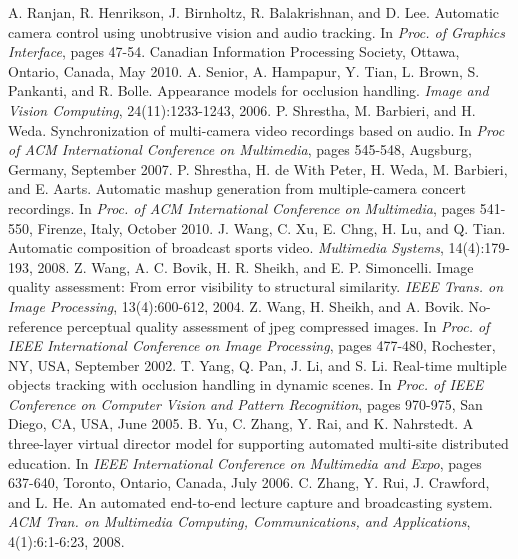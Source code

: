 \documentclass{sig-alternate}
\begin{document}
\begin{thebibliography}{9}
    A. Ranjan, R. Henrikson, J. Birnholtz, R. Balakrishnan, and D. Lee. Automatic camera control using unobtrusive vision and audio tracking. In \textit{Proc. of Graphics Interface}, pages 47-54. Canadian Information Processing Society, Ottawa, Ontario, Canada, May 2010.
    A. Senior, A. Hampapur, Y. Tian, L. Brown, S. Pankanti, and R. Bolle. Appearance models for occlusion handling. \textit{Image and Vision Computing}, 24(11):1233-1243, 2006.
    P. Shrestha, M. Barbieri, and H. Weda. Synchronization of multi-camera video recordings based on audio. In \textit{Proc of ACM International Conference on Multimedia}, pages 545-548, Augsburg, Germany, September 2007.
    P. Shrestha, H. de With Peter, H. Weda, M. Barbieri, and E. Aarts. Automatic mashup generation from multiple-camera concert recordings. In \textit{Proc. of ACM International Conference on Multimedia}, pages 541-550, Firenze, Italy, October 2010.
    J. Wang, C. Xu, E. Chng, H. Lu, and Q. Tian. Automatic composition of broadcast sports video. \textit{Multimedia Systems}, 14(4):179-193, 2008.
    Z. Wang, A. C. Bovik, H. R. Sheikh, and E. P. Simoncelli. Image quality assessment: From error visibility to structural similarity. \textit{IEEE Trans. on Image Processing}, 13(4):600-612, 2004.
    Z. Wang, H. Sheikh, and A. Bovik. No-reference perceptual quality assessment of jpeg compressed images. In \textit{Proc. of IEEE International Conference on Image Processing}, pages 477-480, Rochester, NY, USA, September 2002.
    T. Yang, Q. Pan, J. Li, and S. Li. Real-time multiple objects tracking with occlusion handling in dynamic scenes. In \textit{Proc. of IEEE Conference on Computer Vision and Pattern Recognition}, pages 970-975, San Diego, CA, USA, June 2005.
    B. Yu, C. Zhang, Y. Rai, and K. Nahrstedt. A three-layer virtual director model for supporting automated multi-site distributed education. In \textit{IEEE International Conference on Multimedia and Expo}, pages 637-640, Toronto, Ontario, Canada, July 2006.
    C. Zhang, Y. Rui, J. Crawford, and L. He. An automated end-to-end lecture capture and broadcasting system. \textit{ACM Tran. on Multimedia Computing, Communications, and Applications}, 4(1):6:1-6:23, 2008.
\end{thebibliography}
\end{document}
